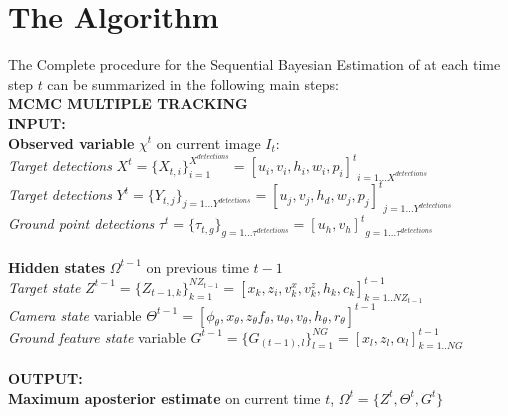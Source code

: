 \newpage
\section{The Algorithm}
The Complete procedure for the Sequential Bayesian Estimation of  at each time step $t$ can be summarized in the following  main steps:
\\
{\bf MCMC MULTIPLE TRACKING }\\[.4cm]
{\sf
\textbf{INPUT:}\\
[.2cm] \textbf{ Observed variable} $\chi^t$ on current image $I_t$:\\
 \hspace*{0.2cm} \textit{Target detections} $X^t=\{X_{t,i}\}_{i=1}^{X^{detections}}={[u_i,v_i,h_i,w_i,p_i]^t}_{i=1...X^{ detections}}$ \\
 \hspace*{0.2cm} \textit{Target detections} $Y^t =\{Y_{t,j}\}_{j=1...Y^{ detections}}={[u_j,v_j,h_d,w_j,p_j]^t}_{j=1...Y^{detections}}$\\
 \hspace*{0.2cm} \textit{Ground point detections} $\tau^t =\{\tau_{t,g}\}_{g=1...\tau^{ detections}}={[u_h,v_h]^t}_{g=1...\tau^{detections}}$
\\
\\
[.2cm] \textbf{ Hidden states} $\Omega^{t-1}$ on previous time $t-1$\\
 \hspace*{0.2cm} \textit{Target state} $Z^{t-1} = \{Z_{{t-1},k} \}_{k=1}^{NZ_{t-1}}=[ x_k,z_i,v_k^x,v_k^z,h_k,c_k]_{k=1..NZ_{t-1}}^{t-1}$\\
 \hspace*{0.2cm} \textit{Camera state} variable $\Theta^{t-1}=[\phi_{\theta}, x_{\theta}, z_{\theta} f_{\theta}, u_{\theta}, v_{\theta}, h_{\theta},r_{\theta}]^{t-1}$\\
 \hspace*{0.2cm} \textit{Ground feature state} variable $G^{t-1} =\{G_{(t-1),l} \}_{l=1}^{NG}=[x_l,z_l,\alpha_l]_{k=1..NG}^{t-1}$
\\
\\
\textbf{OUTPUT:}\\ 
[.2cm] \textbf{ Maximum aposterior estimate} on current time $t$, $\Omega^{t}=\{Z^{t},\Theta^{t},G^{t}\}$\\
}
